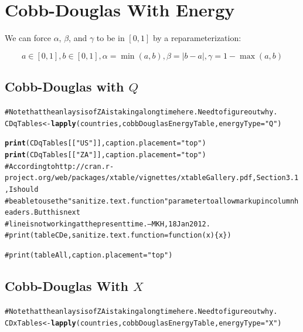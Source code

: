 \documentclass[preprint,authoryear,12pt]{elsarticle}\usepackage{graphicx, color}
\makeatletter
\newcommand{\hlfunctioncall}[1]{\textcolor[rgb]{0.501960784313725,0,0.329411764705882}{\textbf{#1}}}%
\newcommand{\hlstring}[1]{\textcolor[rgb]{0.6,0.6,1}{#1}}%
\newcommand{\hlcomment}[1]{\textcolor[rgb]{0.180392156862745,0.6,0.341176470588235}{#1}}%
\newenvironment{kframe}{%
 \def\at@end@of@kframe{}%
 \ifinner\ifhmode%
  \def\at@end@of@kframe{\end{minipage}}%
  \begin{minipage}{\columnwidth}%
 \fi\fi%
 \def\FrameCommand##1{\hskip\@totalleftmargin \hskip-\fboxsep
 \colorbox{shadecolor}{##1}\hskip-\fboxsep
     \hskip-\linewidth \hskip-\@totalleftmargin \hskip\columnwidth}%
 \MakeFramed {\advance\hsize-\width
   \@totalleftmargin\z@ \linewidth\hsize
   \@setminipage}}%
 {\par\unskip\endMakeFramed%
 \at@end@of@kframe}
\newenvironment{knitrout}{}{} %
\makeatother
\begin{document}
\section{Cobb-Douglas With Energy}

We can force $\alpha$, $\beta$, and $\gamma$ to be in $[0,1]$ by a reparameterization:

\[ a \in[0,1], b \in [0,1], \alpha=\min(a,b), \beta=|b-a|, \gamma = 1-\max(a,b) \]




\subsection{Cobb-Douglas with $Q$}

\begin{knitrout}
\color{fgcolor}\begin{kframe}
\begin{alltt}
\hlcomment{# Note that the anlaysis of ZA is taking a long time here. Need to figure out why.}
CDqTables <- \hlfunctioncall{lapply}(countries, cobbDouglasEnergyTable, energyType=\hlstring{"Q"})
\end{alltt}
\end{kframe}
\end{knitrout}


\begin{kframe}
\begin{alltt}
\hlfunctioncall{print}(CDqTables[[\hlstring{"US"}]], caption.placement=\hlstring{"top"})
\hlfunctioncall{print}(CDqTables[[\hlstring{"ZA"}]], caption.placement=\hlstring{"top"})
\hlcomment{# According to http://cran.r-project.org/web/packages/xtable/vignettes/xtableGallery.pdf, Section 3.1, I should }
\hlcomment{# be able to use the "sanitize.text.function" parameter to allow markup in column headers. But this next}
\hlcomment{# line is not working at the present time. --MKH, 18 Jan 2012.}
\hlcomment{# print(tableCDe, sanitize.text.function = function(x)\{x\})}

\hlcomment{#print(tableAll, caption.placement="top")}
\end{alltt}
\end{kframe}


\subsection{Cobb-Douglas With $X$}

\begin{knitrout}
\color{fgcolor}\begin{kframe}
\begin{alltt}
\hlcomment{# Note that the anlaysis of ZA is taking a long time here. Need to figure out why.}
CDxTables <- \hlfunctioncall{lapply}(countries, cobbDouglasEnergyTable, energyType=\hlstring{"X"})
\end{alltt}
\end{kframe}
\end{knitrout}
\end{document}
